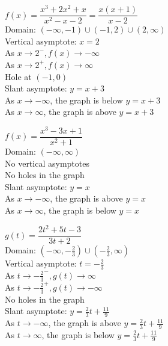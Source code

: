 \begin{exenum}
\item $f(x) = \dfrac{x^3+2x^2+x}{x^{2} -x-2} = \dfrac{x(x+1)}{x - 2}$\\
Domain: $(-\infty, -1) \cup (-1, 2) \cup (2, \infty)$\\
Vertical asymptote: $x = 2$\\
As $x \rightarrow 2^{-}, f(x) \rightarrow -\infty$\\
As $x \rightarrow 2^{+}, f(x) \rightarrow \infty$\\
Hole at $(-1,0)$ \\
Slant asymptote: $y=x+3$ \\
As $x \rightarrow -\infty$, the graph is below $y=x+3$\\
As $x \rightarrow \infty$, the graph is above $y=x+3$\\

\item $f(x) = \dfrac{x^3-3x+1}{x^2+1}$\\
Domain: $(-\infty, \infty)$\\
No vertical asymptotes \\
No holes in the graph \\
Slant asymptote: $y=x$ \\
As $x \rightarrow -\infty$, the graph is above $y=x$ \\
As $x \rightarrow \infty$, the graph is below $y=x$  \\

\item $g(t) = \dfrac{2t^{2} + 5t - 3}{3t + 2}$\\
Domain: $\left(-\infty, -\frac{2}{3}\right) \cup \left(-\frac{2}{3}, \infty\right)$\\
Vertical asymptote: $t = -\frac{2}{3}$\\
As $t \rightarrow -\frac{2}{3}^{-}, g(t) \rightarrow \infty$\\
As $t \rightarrow -\frac{2}{3}^{+}, g(t) \rightarrow -\infty$\\
No holes in the graph \\
Slant asymptote:  $y = \frac{2}{3}t + \frac{11}{9}$ \\
As $t \rightarrow  -\infty$, the graph is above \small $y = \frac{2}{3}t + \frac{11}{9}$\\
\normalsize As $t \rightarrow \infty$, the graph is below \small $y = \frac{2}{3}t + \frac{11}{9}$ \normalsize \\


\end{exenum}
